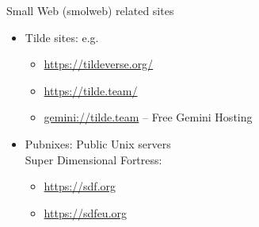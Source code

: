 \documentclass[presentation, 11pt,  aspectratio=169]{beamer}
\begin{document}
\begin{frame}[label={sec:orgdc59568}]{Small Web (smolweb) related sites}
\begin{itemize}
\item \alert{Tilde sites:} e.g.\\
\begin{itemize}
\item \url{https://tildeverse.org/} \\
\item \url{https://tilde.team/} \\
\item \href{gemini://tilde.team}{gemini://tilde.team}  -- Free Gemini Hosting\\
\end{itemize}
\item \alert{Pubnixes:} Public Unix servers\\
Super Dimensional Fortress:\\
\begin{itemize}
\item \url{https://sdf.org}\\
\item \url{https://sdfeu.org}\\
\end{itemize}
\end{itemize}
\end{frame}
\end{document}
